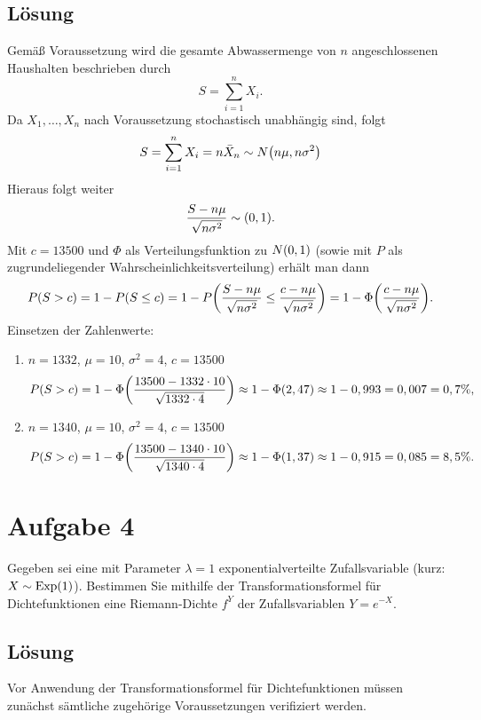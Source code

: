 \documentclass{exercise}
\begin{document}
    \subsection*{Lösung}
    Gemäß Voraussetzung wird die gesamte Abwassermenge von \(n\) angeschlossenen Haushalten beschrieben durch
    \[
        S = \sum_{i = 1}^n X_i.
    \]
    Da \(X_1, \ldots, X_n\) nach Voraussetzung stochastisch unabhängig sind, folgt
    \[
        S = \sum_{i = 1}^n X_i = n\bar{X}_n \sim N\parentheses*{n\mu, n\sigma^2}
    \]
    Hieraus folgt weiter
    \[
        \frac{S - n\mu}{\sqrt{n\sigma^2}} \sim\parentheses*{0, 1}.
    \]
    Mit \(c = 13500\) und \(\Phi\) als Verteilungsfunktion zu \(N\parentheses*{0, 1}\) (sowie mit \(P\) als zugrundeliegender Wahrscheinlichkeitsverteilung) erhält man dann
    \[
        P\parentheses*{S > c} = 1 - P\parentheses*{S \le c} = 1 - P\parentheses*{\frac{S - n\mu}{\sqrt{n\sigma^2}} \le \frac{c - n\mu}{\sqrt{n\sigma^2}}} = 1 - \Phi\parentheses*{\frac{c - n\mu}{\sqrt{n\sigma^2}}}.
    \]
    Einsetzen der Zahlenwerte:
    \begin{enumerate}
        \item \(n = 1332\), \(\mu = 10\), \(\sigma^2 = 4\), \(c = 13500\)
        \[
            P\parentheses*{S > c} = 1 - \Phi\parentheses*{\frac{13500 - 1332 \cdot 10}{\sqrt{1332 \cdot 4}}} \approx 1 - \Phi\parentheses*{2,47} \approx 1 - 0,993 = 0,007 = 0,7\%,
        \]
        \item \(n = 1340\), \(\mu = 10\), \(\sigma^2 = 4\), \(c = 13500\)
        \[
            P\parentheses*{S > c} = 1 - \Phi\parentheses*{\frac{13500 - 1340 \cdot 10}{\sqrt{1340 \cdot 4}}} \approx 1 - \Phi\parentheses*{1,37} \approx 1 - 0,915 = 0,085 = 8,5\%.
        \]
    \end{enumerate}


    \section*{Aufgabe 4}
    
    \begin{problem}
        Gegeben sei eine mit Parameter \(\lambda = 1\) exponentialverteilte Zufallsvariable (kurz: \(X \sim \Exp\parentheses*{1}\)).
        Bestimmen Sie mithilfe der Transformationsformel für Dichtefunktionen eine Riemann-Dichte \(f^Y\) der Zufallsvariablen \(Y = e^{-X}\).
    \end{problem}
    
    \subsection*{Lösung}
    Vor Anwendung der Transformationsformel für Dichtefunktionen müssen zunächst sämtliche zugehörige Voraussetzungen verifiziert werden.
\end{document}

